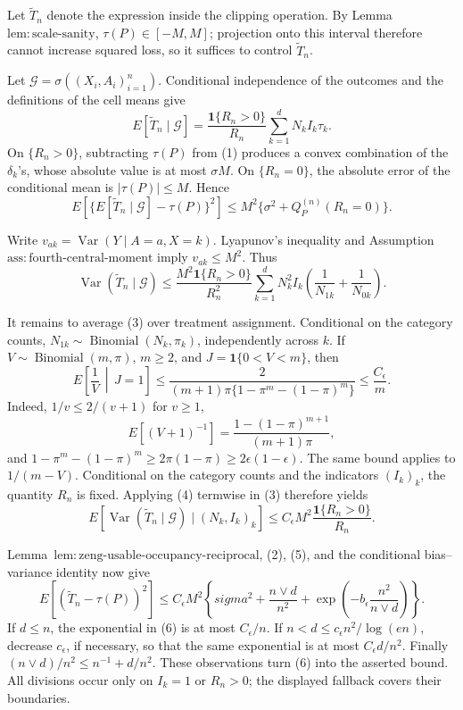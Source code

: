 Let \(\widetilde T_n\) denote the expression inside the clipping operation.  By Lemma~\(\mathrm{lem:scale\text{-}sanity}\), \(\tau(P)\in[-M,M]\); projection onto this interval therefore cannot increase squared loss, so it suffices to control \(\widetilde T_n\).

Let \(\mathcal G=\sigma((X_i,A_i)_{i=1}^n)\).  Conditional independence of the outcomes and the definitions of the cell means give
\[
 E[\widetilde T_n\mid\mathcal G]
 =\frac{\mathbf 1\{R_n>0\}}{R_n}\sum_{k=1}^dN_kI_k\tau_k.
\tag{1}
\]
On \(\{R_n>0\}\), subtracting \(\tau(P)\) from (1) produces a convex combination of the \(\delta_k\)'s, whose absolute value is at most \(\sigma M\).  On \(\{R_n=0\}\), the absolute error of the conditional mean is \(|\tau(P)|\le M\).  Hence
\[
 E\!\left[\{E[\widetilde T_n\mid\mathcal G]-\tau(P)\}^2\right]
 \le M^2\{\sigma^2+Q_P^{(n)}(R_n=0)\}.
\tag{2}
\]

Write \(v_{ak}=\operatorname{Var}(Y\mid A=a,X=k)\).  Lyapunov's inequality and Assumption~\(\mathrm{ass:fourth\text{-}central\text{-}moment}\) imply \(v_{ak}\le M^2\).  Thus
\[
 \operatorname{Var}(\widetilde T_n\mid\mathcal G)
 \le \frac{M^2\mathbf 1\{R_n>0\}}{R_n^2}
 \sum_{k=1}^dN_k^2I_k\left(\frac1{N_{1k}}+\frac1{N_{0k}}\right).
\tag{3}
\]

It remains to average (3) over treatment assignment.  Conditional on the category counts, \(N_{1k}\sim\operatorname{Binomial}(N_k,\pi_k)\), independently across \(k\).  If \(V\sim\operatorname{Binomial}(m,\pi)\), \(m\ge2\), and \(J=\mathbf 1\{0<V<m\}\), then
\[
 E\left[\frac1V\,\middle|\,J=1\right]
 \le \frac{2}{(m+1)\pi\{1-\pi^m-(1-\pi)^m\}}
 \le \frac{C_{\epsilon}}m.
\tag{4}
\]
Indeed, \(1/v\le2/(v+1)\) for \(v\ge1\),
\[
 E[(V+1)^{-1}]=\frac{1-(1-\pi)^{m+1}}{(m+1)\pi},
\]
and \(1-\pi^m-(1-\pi)^m\ge2\pi(1-\pi)\ge2\epsilon(1-\epsilon)\).  The same bound applies to \(1/(m-V)\).  Conditional on the category counts and the indicators \((I_k)_k\), the quantity \(R_n\) is fixed.  Applying (4) termwise in (3) therefore yields
\[
 E[\operatorname{Var}(\widetilde T_n\mid\mathcal G)\mid (N_k,I_k)_k]
 \le C_{\epsilon}M^2\frac{\mathbf 1\{R_n>0\}}{R_n}.
\tag{5}
\]

Lemma~\(\mathrm{lem:zeng\text{-}usable\text{-}occupancy\text{-}reciprocal}\), (2), (5), and the conditional bias--variance identity now give
\[
 E[(\widetilde T_n-\tau(P))^2]
 \le C_{\epsilon}M^2\left\{sigma^2+\frac{n\vee d}{n^2}
 +\exp\left(-b_{\epsilon}\frac{n^2}{n\vee d}\right)\right\}.
\tag{6}
\]
If \(d\le n\), the exponential in (6) is at most \(C_{\epsilon}/n\).  If \(n<d\le c_{\epsilon}n^2/\log(en)\), decrease \(c_{\epsilon}\), if necessary, so that the same exponential is at most \(C_{\epsilon}d/n^2\).  Finally \((n\vee d)/n^2\le n^{-1}+d/n^2\).  These observations turn (6) into the asserted bound.  All divisions occur only on \(I_k=1\) or \(R_n>0\); the displayed fallback covers their boundaries.